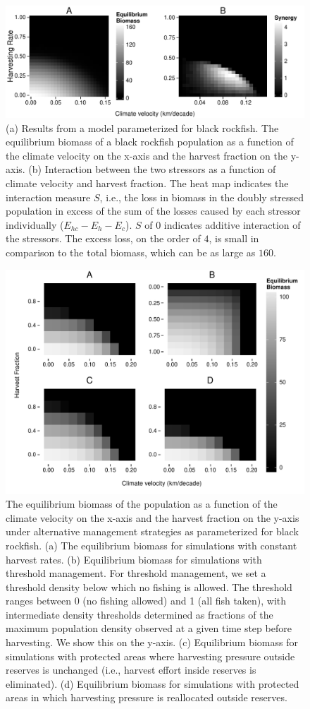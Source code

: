 \documentclass[12pt,english]{article}
\begin{document}
 \begin{figure}[h]
 \centering
 \includegraphics[width=.75\textwidth]{../../plots/rockfisheqbiomass.pdf}
 \caption{ \label{synergy_rockfish}
 (a) Results from a model parameterized for black rockfish. The equilibrium biomass of a black rockfish population as a function of the climate velocity on the x-axis and the harvest fraction on the y-axis. (b) Interaction between the two stressors as a function of climate velocity and harvest fraction. The heat map indicates the interaction measure $S$, i.e., the loss in biomass in the doubly stressed population in excess of the sum of the losses caused by each stressor individually ($E_{hc}-E_h-E_c$). $S$ of $0$ indicates additive interaction of the stressors. The excess loss, on the order of $4$, is small in comparison to the total biomass, which can be as large as $160$.
 }
 \end{figure}

\begin{figure}[h]
\centering
\includegraphics[width=.75\textwidth]{../../plots/rockfish_sims.pdf}
\caption{\label{simulation_rockfish} The equilibrium biomass of the population as a function of the climate velocity on the x-axis and the harvest fraction on the y-axis under alternative management strategies as parameterized for black rockfish. (a) The equilibrium biomass for simulations with constant harvest rates. (b) Equilibrium biomass for simulations with threshold management. For threshold management, we set a threshold density below which no fishing is allowed. The threshold ranges between 0 (no fishing allowed) and 1 (all fish taken), with intermediate density thresholds determined as fractions of the maximum population density observed at a given time step before harvesting. We show this on the y-axis. (c) Equilibrium biomass for simulations with protected areas where harvesting pressure outside reserves is unchanged  (i.e., harvest effort inside reserves is eliminated). (d) Equilibrium biomass for simulations with protected areas in which harvesting pressure is reallocated outside reserves.}
\end{figure}


\cleardoublepage


\end{document}
